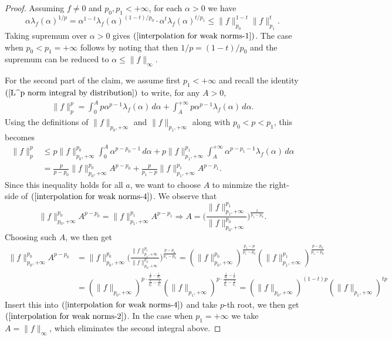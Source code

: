 \begin{proof}
Assuming $f\neq 0$ and $p_0,p_1<+\infty$, for each $\alpha>0$ we have
\[\alpha\lambda_f(\alpha)^{1/p}=\alpha^{1-t}\lambda_f(\alpha)^{(1-t)/p_0}\cdot\alpha^{t}\lambda_f(\alpha)^{t/p_1}\leq\|f\|_{p_0}^{1-t}\|f\|_{p_1}^t.\]
Taking supremum over $\alpha>0$ gives $(\ref{interpolation for weak norms-1})$. The case when $p_0<p_1=+\infty$ follows by noting that then $1/p=(1-t)/p_0$ and the supremum can be reduced to $\alpha\leq\|f\|_{\infty}$.\par
For the second part of the claim, we assume first $p_1<+\infty$ and recall the identity $(\ref{L^p norm integral by distribution})$ to write, for any $A>0$,
\begin{align}\label{interpolation for weak norms-3}
\|f\|_{p}^{p}=\int_{0}^{A}p\alpha^{p-1}\lambda_f(\alpha)\,d\alpha+\int_{A}^{+\infty}p\alpha^{p-1}\lambda_f(\alpha)\,d\alpha.
\end{align}
Using the definitions of $\|f\|_{p_0,+\infty}$ and $\|f\|_{p_1,+\infty}$ along with $p_0<p<p_1$, this becomes
\begin{equation}\label{interpolation for weak norms-4}
\begin{aligned}
\|f\|_{p}^{p}&\leq p\|f\|_{p_0,+\infty}^{p_0}\int_{0}^{A}\alpha^{p-p_0-1}\,d\alpha+p\|f\|_{p_1,+\infty}^{p_1}\int_{A}^{+\infty}\alpha^{p-p_1-1}\lambda_f(\alpha)\,d\alpha\\
&=\frac{p}{p-p_0}\|f\|_{p_0,+\infty}^{p_0}A^{p-p_0}+\frac{p}{p_1-p}\|f\|_{p_1,+\infty}^{p_1}A^{p-p_1}.
\end{aligned}
\end{equation}
Since this inequality holds for all $a$, we want to choose $A$ to minmize the right-side of $(\ref{interpolation for weak norms-4})$. We observe that
\[\|f\|_{p_0,+\infty}^{p_0}A^{p-p_0}=\|f\|_{p_1,+\infty}^{p_1}A^{p-p_1}\Longrightarrow A=\Big(\frac{\|f\|_{p_1,+\infty}^{p_1}}{\|f\|_{p_0,+\infty}^{p_0}}\Big)^{\frac{1}{p_1-p_0}}.\] 
Choosing such $A$, we then get
\begin{align*}
\|f\|_{p_0,+\infty}^{p_0}A^{p-p_0}&=\|f\|_{p_0,+\infty}^{p_0}\Big(\frac{\|f\|_{p_1,+\infty}^{p_1}}{\|f\|_{p_0,+\infty}^{p_0}}\Big)^{\frac{p-p_0}{p_1-p_0}}=(\|f\|_{p_0,+\infty}^{p_0})^{\frac{p_1-p}{p_1-p_0}}(\|f\|_{p_1,+\infty}^{p_1})^{\frac{p-p_0}{p_1-p_0}}\\
&=(\|f\|_{p_0,+\infty})^{p\cdot\frac{\frac{1}{p}-\frac{1}{p_1}}{\frac{1}{p_0}-\frac{1}{p_1}}}(\|f\|_{p_1,+\infty})^{p\cdot\frac{\frac{1}{p_0}-\frac{1}{p}}{\frac{1}{p_0}-\frac{1}{p_1}}}=(\|f\|_{p_0,+\infty})^{(1-t)p}(\|f\|_{p_1,+\infty})^{tp}
\end{align*}
Insert this into $(\ref{interpolation for weak norms-4})$ and take $p$-th root, we then get $(\ref{interpolation for weak norms-2})$. In the case when $p_1=+\infty$ we take $A=\|f\|_{\infty}$, which eliminates the second integral above.
\end{proof}
